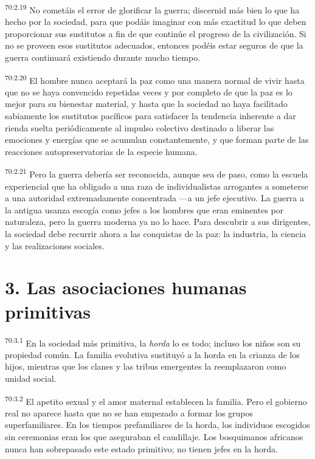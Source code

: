 \documentclass[twoside, 11pt]{book}
\begin{document}
\par
\textsuperscript{70:2.19} No cometáis el error de glorificar la guerra; discernid más bien lo que ha hecho por la sociedad, para que podáis imaginar con más exactitud lo que deben proporcionar sus sustitutos a fin de que continúe el progreso de la civilización. Si no se proveen esos sustitutos adecuados, entonces podéis estar seguros de que la guerra continuará existiendo durante mucho tiempo.

\par
\textsuperscript{70:2.20} El hombre nunca aceptará la paz como una manera normal de vivir hasta que no se haya convencido repetidas veces y por completo de que la paz es lo mejor para su bienestar material, y hasta que la sociedad no haya facilitado sabiamente los sustitutos pacíficos para satisfacer la tendencia inherente a dar rienda suelta periódicamente al impulso colectivo destinado a liberar las emociones y energías que se acumulan constantemente, y que forman parte de las reacciones autopreservatorias de la especie humana.

\par
\textsuperscript{70:2.21} Pero la guerra debería ser reconocida, aunque sea de paso, como la escuela experiencial que ha obligado a una raza de individualistas arrogantes a someterse a una autoridad extremadamente concentrada ---a un jefe ejecutivo. La guerra a la antigua usanza escogía como jefes a los hombres que eran eminentes por naturaleza, pero la guerra moderna ya no lo hace. Para descubrir a sus dirigentes, la sociedad debe recurrir ahora a las conquistas de la paz: la industria, la ciencia y las realizaciones sociales.

\section*{3. Las asociaciones humanas primitivas}
\par
\textsuperscript{70:3.1} En la sociedad más primitiva, la \textit{horda} lo es todo; incluso los niños son su propiedad común. La familia evolutiva sustituyó a la horda en la crianza de los hijos, mientras que los clanes y las tribus emergentes la reemplazaron como unidad social.

\par
\textsuperscript{70:3.2} El apetito sexual y el amor maternal establecen la familia. Pero el gobierno real no aparece hasta que no se han empezado a formar los grupos superfamiliares. En los tiempos prefamiliares de la horda, los individuos escogidos sin ceremonias eran los que aseguraban el caudillaje. Los bosquimanos africanos nunca han sobrepasado este estado primitivo; no tienen jefes en la horda.
\end{document}
